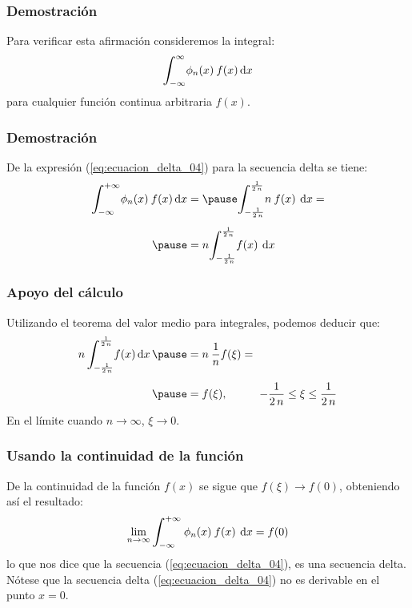 \documentclass[12pt]{beamer}
\begin{document}
\begin{frame}
\frametitle{Demostración}
Para verificar esta afirmación consideremos la integral:
\pause
\begin{align*}
\scaleint{6ex}_{\bs -\infty}^{\infty} \phi_{n} (x) \: f (x) \dd{x}
\end{align*}
para cualquier función continua arbitraria $f (x)$.
\end{frame}

\begin{frame}
\frametitle{Demostración}
De la expresión (\ref{eq:ecuacion_delta_04}) para la secuencia delta se tiene:
\pause
\begin{eqnarray*}
\scaleint{6ex}_{\bs -\infty}^{+ \infty} \phi_{n} (x) \: f (x) \dd{x} &=  \pause \scaleint{6ex}_{\bs -\frac{1}{2 \, n}}^{\frac{1}{2 \, n}} n \: f (x) \: \dd{x} = \\[0.5em] \pause
&= n \scaleint{6ex}_{\bs -\frac{1}{2 \, n}}^{\frac{1}{2 \, n}} f (x) \:  \dd{x}
\end{eqnarray*}
\end{frame}

\begin{frame}
\frametitle{Apoyo del cálculo}
Utilizando el teorema del valor medio para integrales, podemos deducir que:
\pause
\begin{eqnarray*}
\begin{aligned}
n \, \scaleint{6ex}_{\bs -\frac{1}{2 \, n}}^{\frac{1}{2 \, n}} f (x) \dd{x} \pause &= n \: \dfrac{1}{n} f (\xi) = \\[0.5em] \pause
&= f (\xi), \hspace{1cm} - \dfrac{1}{2 \, n} \leq \xi \leq \dfrac{1}{2 \, n}
\end{aligned}
\end{eqnarray*}
En el límite cuando $n \to \infty$, $\xi \to 0$.
\end{frame}

\begin{frame}
\frametitle{Usando la continuidad de la función}
De la continuidad de la función $f (x)$ se sigue que $f (\xi) \to f (0)$, obteniendo así el resultado:
\pause
\begin{align*}
\lim_{n \to \infty} \scaleint{6ex}_{\bs -\infty}^{+ \infty} \: \phi_{n} (x) \: f (x) \: \dd{x} = f (0)
\end{align*}
lo que nos dice que la secuencia (\ref{eq:ecuacion_delta_04}), es una secuencia delta. \pause  Nótese que la secuencia delta (\ref{eq:ecuacion_delta_04}) no es derivable en el punto $x = 0$.
\end{frame}
\end{document}
